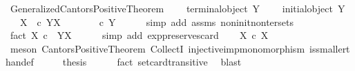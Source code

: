 \begin{isabellebody}
\ Generalized{\isacharunderscore}{\kern0pt}Cantors{\isacharunderscore}{\kern0pt}Positive{\isacharunderscore}{\kern0pt}Theorem{\isacharcolon}{\kern0pt}\isanewline
\ \ \ {\isachardoublequoteopen}{\isasymnot}\ terminal{\isacharunderscore}{\kern0pt}object\ Y{\isachardoublequoteclose}\isanewline
\ \ \ {\isachardoublequoteopen}{\isasymnot}\ initial{\isacharunderscore}{\kern0pt}object\ Y{\isachardoublequoteclose}\isanewline
\ \ \ {\isachardoublequoteopen}X\ \ {\isasymle}\isactrlsub c\ Y\isactrlbsup X\isactrlesup {\isachardoublequoteclose}\isanewline
%
\isadelimproof
%
\endisadelimproof
%
\isatagproof
{}\isamarkupfalse%
\ {\isacharminus}{\kern0pt}\ \isanewline
\ \ \isamarkupfalse%
\ {\isachardoublequoteopen}{\isasymOmega}\ {\isasymle}\isactrlsub c\ Y{\isachardoublequoteclose}\isanewline
\ \ \ \ \isamarkupfalse%
\ {\isacharparenleft}{\kern0pt}simp\ add{\isacharcolon}{\kern0pt}\ assms\ non{\isacharunderscore}{\kern0pt}init{\isacharunderscore}{\kern0pt}non{\isacharunderscore}{\kern0pt}ter{\isacharunderscore}{\kern0pt}sets{\isacharparenright}{\kern0pt}\isanewline
\ \ \isamarkupfalse%
\ \isamarkupfalse%
\ fact{\isacharcolon}{\kern0pt}\ {\isachardoublequoteopen}{\isasymOmega}\isactrlbsup X\isactrlesup \ {\isasymle}\isactrlsub c\ \ Y\isactrlbsup X\isactrlesup {\isachardoublequoteclose}\isanewline
\ \ \ \ \isamarkupfalse%
\ {\isacharparenleft}{\kern0pt}simp\ add{\isacharcolon}{\kern0pt}\ exp{\isacharunderscore}{\kern0pt}preserves{\isacharunderscore}{\kern0pt}card{}{\isacharparenright}{\kern0pt}\isanewline
\ \ \isamarkupfalse%
\ {\isachardoublequoteopen}X\ {\isasymle}\isactrlsub c\ {\isasymOmega}\isactrlbsup X\isactrlesup {\isachardoublequoteclose}\isanewline
\ \ \ \ \isamarkupfalse%
\ {\isacharparenleft}{\kern0pt}meson\ Cantors{\isacharunderscore}{\kern0pt}Positive{\isacharunderscore}{\kern0pt}Theorem\ CollectI\ injective{\isacharunderscore}{\kern0pt}imp{\isacharunderscore}{\kern0pt}monomorphism\ is{\isacharunderscore}{\kern0pt}smaller{\isacharunderscore}{\kern0pt}than{\isacharunderscore}{\kern0pt}def{\isacharparenright}{\kern0pt}\isanewline
\ \ \isamarkupfalse%
\ \isamarkupfalse%
\ {\isacharquery}{\kern0pt}thesis\isanewline
\ \ \ \ \isamarkupfalse%
\ fact\ set{\isacharunderscore}{\kern0pt}card{\isacharunderscore}{\kern0pt}transitive\ \isamarkupfalse%
\ blast\isanewline
{}\isamarkupfalse%
%
\endisatagproof

\end{isabellebody}
